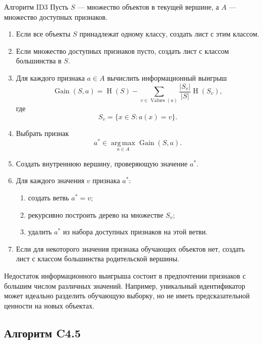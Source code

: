 \documentclass[12pt,a4paper]{article}
\theoremstyle{plain}
\theoremstyle{definition}
\theoremstyle{remark}
\newcommand{\argmax}{\operatorname*{arg\,max}}
\newcommand{\Entropy}{\operatorname{H}}
\newcommand{\Gain}{\operatorname{Gain}}
\begin{document}
\begin{algorithmblock}{Алгоритм ID3}
Пусть $S$ --- множество объектов в текущей вершине, а $A$ --- множество
доступных признаков.

\begin{enumerate}[label=\arabic*.]
    \item Если все объекты $S$ принадлежат одному классу, создать лист с
    этим классом.

    \item Если множество доступных признаков пусто, создать лист с
    классом большинства в $S$.

    \item Для каждого признака $a\in A$ вычислить информационный выигрыш
    \[
        \Gain(S,a)
        =
        \Entropy(S)
        -
        \sum_{v\in\operatorname{Values}(a)}
        \frac{|S_v|}{|S|}
        \Entropy(S_v),
    \]
    где
    \[
        S_v=\{x\in S:a(x)=v\}.
    \]

    \item Выбрать признак
    \[
        a^*
        \in
        \argmax_{a\in A}\Gain(S,a).
    \]

    \item Создать внутреннюю вершину, проверяющую значение $a^*$.

    \item Для каждого значения $v$ признака $a^*$:
    \begin{enumerate}[label=\alph*)]
        \item создать ветвь $a^*=v$;
        \item рекурсивно построить дерево на множестве $S_v$;
        \item удалить $a^*$ из набора доступных признаков на этой ветви.
    \end{enumerate}

    \item Если для некоторого значения признака обучающих объектов нет,
    создать лист с классом большинства родительской вершины.
\end{enumerate}
\end{algorithmblock}

Недостаток информационного выигрыша состоит в предпочтении признаков с
большим числом различных значений. Например, уникальный идентификатор
может идеально разделить обучающую выборку, но не иметь предсказательной
ценности на новых объектах.

\subsection{Алгоритм C4.5}
\end{document}
